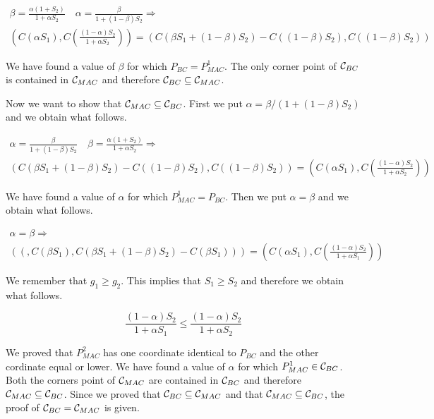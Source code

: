 \begin{gather*}
	\beta = \frac{\alpha(1+S_2)}{1+\alpha S_2} \quad  \alpha = \frac{\beta}{1+ (1-\beta) S_2} \Rightarrow \\
	\left( C(\alpha S_1) , C \left( \frac{(1-\alpha)S_2}{1+\alpha S_2} \right) \right) = \left( C (\beta S_1 + (1-\beta)S_2) - C((1-\beta)S_2) , C \left( (1-\beta)S_2 \right) \right)
\end{gather*}

We have found a value of $\beta$ for which $P_{BC} = P_{MAC}^1$. The only corner point of $\mathcal{C}_{BC}$ is contained in $\mathcal{C}_{MAC}$ and therefore $\mathcal{C}_{BC} \subseteq \mathcal{C}_{MAC}$.

Now we want to show that $\mathcal{C}_{MAC} \subseteq \mathcal{C}_{BC}$. First we put $\alpha = \beta / (1+(1-\beta)S_2)$ and we obtain what follows.

\begin{gather*}
	\alpha = \frac{\beta}{1+ (1-\beta) S_2} \quad \beta = \frac{\alpha(1+S_2)}{1+\alpha S_2}  \Rightarrow \\
	\left( C (\beta S_1 + (1-\beta)S_2) - C((1-\beta)S_2) , C \left( (1-\beta)S_2 \right) \right)
	= \left( C(\alpha S_1) , C \left( \frac{(1-\alpha)S_2}{1+\alpha S_2} \right) \right)
\end{gather*}

We have found a value of $\alpha$ for which $P_{MAC}^1 = P_{BC}$. Then we put $\alpha = \beta$ and we obtain what follows.

\begin{gather*}
	\alpha = \beta \Rightarrow \\
	(\left( , C \left(\beta S_1 \right), C (\beta S_1 + (1-\beta)S_2) - C(\beta S_1) \right)) =  \left( C \left(\alpha S_1 \right), C \left( \frac{(1-\alpha)S_2}{1 + \alpha S_1}\right) \right)
\end{gather*}

We remember that $g_1 \geq g_2$. This implies that $S_1 \geq S_2$ and therefore we obtain what follows.

\begin{equation*}
	\frac{(1-\alpha)S_2}{1 + \alpha S_1} \leq \frac{(1-\alpha)S_2}{1 + \alpha S_2}
\end{equation*}

We proved that $P_{MAC}^2$ has one coordinate identical to $P_{BC}$ and the other cordinate equal or lower. We have found a value of $\alpha$ for which $P_{MAC}^1 \in \mathcal{C}_{BC}$. Both the corners point of $\mathcal{C}_{MAC}$ are contained in $\mathcal{C}_{BC}$ and therefore $\mathcal{C}_{MAC} \subseteq \mathcal{C}_{BC}$. Since we proved that $\mathcal{C}_{BC} \subseteq \mathcal{C}_{MAC}$ and that $\mathcal{C}_{MAC} \subseteq \mathcal{C}_{BC}$, the proof of $\mathcal{C}_{BC}=\mathcal{C}_{MAC}$ is given.

